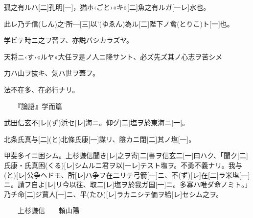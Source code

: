 \documentclass[b5paper, 8pt, twoside]{ltjtreport}
\begin{document}
\begin{multicols*}{2}
\Kanbun
孤之有ルハ[二]孔明[一]，猶ホ‹ごと›«キ»[二]魚之有ルガ[一レ]水也。
\EndKanbun
{}

\Kanbun
此レ乃チ信(しん)之‘所―[三]以’(ゆゑん)為ル[二]陛下ノ禽(とりこ)ト[一]也。
\EndKanbun
{}

{\kan{}\par}

\Kanbun
学ビテ時ニ之ヲ習フ、亦説バシカラズヤ。
\EndKanbun
{}

\Kanbun
天将ニ‹す›«ルヤ»大任ヲ是ノ人ニ降サント、必ズ先ズ其ノ心志ヲ苦シメ
\EndKanbun
{}

\Kanbun
力ハ山ヲ抜キ、気ハ世ヲ蓋フ。
\EndKanbun
{}

\Kanbun
法不在多、在必行ナリ。
\EndKanbun


\br
{\large　　『論語』学而篇}
\vspace*{1em}

{\kan
{}
\par
}

\Kanbun
武田信玄不[レ](ず)浜セ[レ]海ニ。仰グ[二]塩ヲ於東海ニ[一]。
\EndKanbun
{}

\Kanbun
北条氏真与[二](と)北條氏康[一]謀リ、陰カニ閉[二]其ノ塩[一]。
\EndKanbun
{}

\Kanbun
甲斐多イニ困シム。上杉謙信聞き[レ]之ヲ寄[二]書ヲ信玄二[一]曰ハク、「聞ク[二]氏康・氏真困(くる)[レ]シムルニ君ヲ以[一レ]テスト塩ヲ。不勇不義ナリ。我与(と)[レ]公争ヘドモ、所[レ]ハ争フ在二リテ弓箭[一]ニ、不(ず)[レ]在[二]ラ米塩[一]ニ。請フ自よ[レ]リ今以往、取二[レ]塩ヲ於我ガ国[一]ニ。多寡ハ唯ダ命ノミト。」乃チ命[二]ジ賈人[一]ニ、平(たひ)[レ]ラカニシテ価ヲ給[レ]セシム之ヲ。
\EndKanbun
{}

\br
{\large 　　上杉謙信}　　頼山陽
\vspace*{1em}

{\kan\overkLine{\信\北\甲}\par}
\end{multicols*}
\end{document}
